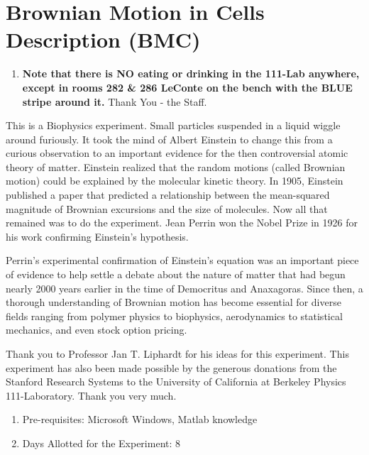 \documentclass{../lab}
\begin{document}
\maketitle

\tableofcontents

\section{Brownian Motion in Cells Description (BMC)}

\begin{enumerate}
    \item \textbf{Note that there is NO eating or drinking in the 111-Lab anywhere, except in rooms 282 \& 286 LeConte on the bench with the BLUE stripe around it.} Thank You - the Staff.
\end{enumerate}

This is a Biophysics experiment. Small particles suspended in a liquid wiggle around furiously. It took the mind of Albert Einstein to change this from a curious observation to an important evidence for the then controversial atomic theory of matter. Einstein realized that the random motions (called Brownian motion) could be explained by the molecular kinetic theory. In 1905, Einstein published a paper that predicted a relationship between the mean-squared magnitude of Brownian excursions and the size of molecules. Now all that remained was to do the experiment. Jean Perrin won the Nobel Prize in 1926 for his work confirming Einstein's hypothesis.

Perrin's experimental confirmation of Einstein's equation was an important piece of evidence to help settle a debate about the nature of matter that had begun nearly 2000 years earlier in the time of Democritus and Anaxagoras. Since then, a thorough understanding of Brownian motion has become essential for diverse fields ranging from polymer physics to biophysics, aerodynamics to statistical mechanics, and even stock option pricing.

Thank you to Professor Jan T. Liphardt for his ideas for this experiment. This experiment has also been made possible by the generous donations from the Stanford Research Systems to the University of California at Berkeley Physics 111-Laboratory. Thank you very much.

\begin{enumerate}
    \item Pre-requisites: Microsoft Windows, Matlab knowledge

    \item Days Allotted for the Experiment: 8
\end{enumerate}
\end{document}
